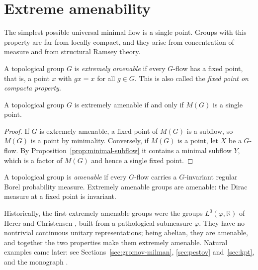 \section{Extreme amenability}\label{sec:ea}

The simplest possible universal minimal flow is a single point. Groups with
this property are far from locally compact, and they arise from concentration
of measure and from structural Ramsey theory.

\begin{definition}\label{def:ea}
A topological group $G$ is \emph{extremely amenable} if every $G$-flow has a
fixed point, that is, a point $x$ with $gx=x$ for all $g\in G$. This is also
called the \emph{fixed point on compacta property}.
\end{definition}

\begin{proposition}\label{prop:ea-trivial-umf}
A topological group $G$ is extremely amenable if and only if $M(G)$ is a
single point.
\end{proposition}

\begin{proof}
If $G$ is extremely amenable, a fixed point of $M(G)$ is a subflow, so
$M(G)$ is a point by minimality. Conversely, if $M(G)$ is a point, let $X$ be
a $G$-flow. By Proposition~\ref{prop:minimal-subflow} it contains a minimal
subflow $Y$, which is a factor of $M(G)$ and hence a single fixed point.
\end{proof}

\begin{remark}\label{rem:ea-amenable}
A topological group is \emph{amenable} if every $G$-flow carries a
$G$-invariant regular Borel probability measure. Extremely amenable groups are
amenable: the Dirac measure at a fixed point is invariant.
\end{remark}

\begin{remark}\label{rem:herer-christensen}
Historically, the first extremely amenable groups were the groups
$L^0(\varphi,\mathbb{R})$ of Herer and Christensen \cite{HererChristensen1975},
built from a pathological submeasure $\varphi$. They have no nontrivial
continuous unitary representations; being abelian, they are amenable, and
together the two properties make them extremely amenable. Natural examples
came later: see Sections~\ref{sec:gromov-milman}, \ref{sec:pestov}
and~\ref{sec:kpt}, and the monograph \cite{Pestov2006}.
\end{remark}
